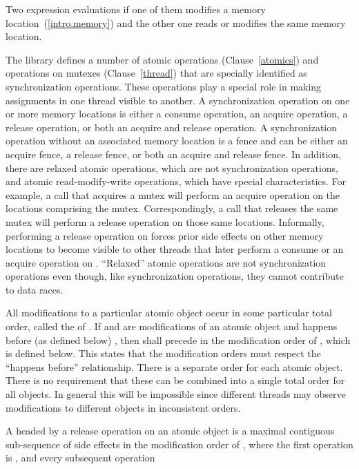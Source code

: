 \pnum
Two expression evaluations  if one of them modifies a memory
location~(\ref{intro.memory}) and the other one reads or modifies the same
memory location.

\pnum
The library defines a number of atomic operations (Clause~\ref{atomics}) and
operations on mutexes (Clause~\ref{thread}) that are specially identified as
synchronization operations. These operations play a special role in making
assignments in one thread visible to another. A synchronization operation on one
or more memory locations is either a consume operation, an acquire operation, a
release operation, or both an acquire and release operation. A synchronization
operation without an associated memory location is a fence and can be either an
acquire fence, a release fence, or both an acquire and release fence. In
addition, there are relaxed atomic operations, which are not synchronization
operations, and atomic read-modify-write operations, which have special
characteristics. \enternote For example, a call that acquires a mutex will
perform an acquire operation on the locations comprising the mutex.
Correspondingly, a call that releases the same mutex will perform a release
operation on those same locations. Informally, performing a release operation on
 forces prior
%
side effects on other memory locations to become visible
to other threads that later perform a consume or an acquire operation on
. ``Relaxed'' atomic operations are not synchronization operations even
though, like synchronization operations, they cannot contribute to data races.
\exitnote

\pnum
All modifications to a particular atomic object  occur in some
particular total order, called the  of . If
 and  are modifications of an atomic object  and
 happens before (as defined below) , then  shall precede
 in the modification order of , which is defined below.
\enternote This states that the modification orders must respect the ``happens
before'' relationship. \exitnote \enternote There is a separate order for each
atomic object. There is no requirement that these can be combined into a single
total order for all objects. In general this will be impossible since different
threads may observe modifications to different objects in inconsistent orders.
\exitnote

\pnum
A  headed by a release operation  on an atomic object
 is a maximal contiguous sub-sequence of
%
side effects in the
modification order of , where the first operation is , and
every subsequent operation

